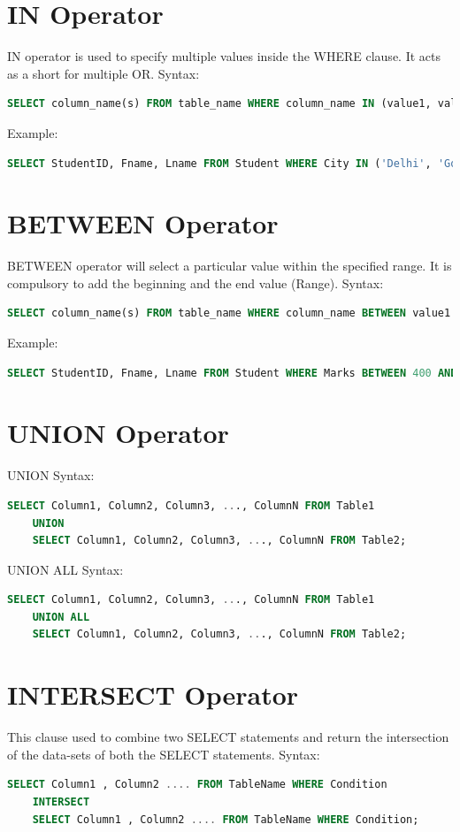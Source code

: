 \section{IN Operator}
IN operator is used to specify multiple values inside the WHERE clause. It acts as a short for multiple OR.
Syntax:
\begin{lstlisting}[language=sql]
	SELECT column_name(s) FROM table_name WHERE column_name IN (value1, value2, ...); 
\end{lstlisting}
Example:
\begin{lstlisting}[language=sql]
	SELECT StudentID, Fname, Lname FROM Student WHERE City IN ('Delhi', 'Goa', 'Pune','Bengaluru');
\end{lstlisting}

\section{BETWEEN Operator}
BETWEEN operator will select a particular value within the specified range. It is compulsory to add the beginning and the end value (Range).
Syntax:
\begin{lstlisting}[language=sql]
	SELECT column_name(s) FROM table_name WHERE column_name BETWEEN value1 AND value2;
\end{lstlisting}
Example:
\begin{lstlisting}[language=sql]
	SELECT StudentID, Fname, Lname FROM Student WHERE Marks BETWEEN 400 AND 500;
\end{lstlisting}

\section{UNION Operator}
UNION Syntax:
\begin{lstlisting}[language=sql]
	SELECT Column1, Column2, Column3, ..., ColumnN FROM Table1
	UNION
	SELECT Column1, Column2, Column3, ..., ColumnN FROM Table2;	
\end{lstlisting}
UNION ALL Syntax:
\begin{lstlisting}[language=sql]
	SELECT Column1, Column2, Column3, ..., ColumnN FROM Table1
	UNION ALL
	SELECT Column1, Column2, Column3, ..., ColumnN FROM Table2;
\end{lstlisting}


\section{INTERSECT Operator}
This clause used to combine two SELECT statements and return the intersection of the data-sets of both the SELECT statements.
Syntax:
\begin{lstlisting}[language=sql]
	SELECT Column1 , Column2 .... FROM TableName WHERE Condition
	INTERSECT
	SELECT Column1 , Column2 .... FROM TableName WHERE Condition;
\end{lstlisting}